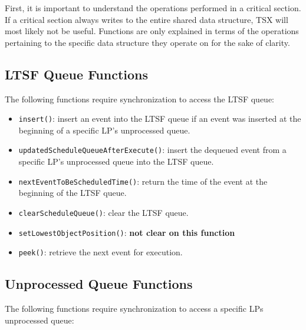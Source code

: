 \documentclass[11pt]{book}
\begin{document}
First, it is important to understand the operations performed in a critical section.  If a
critical section always writes to the entire shared data structure, TSX will most likely
not be useful.  Functions are only explained in terms of the operations pertaining to the
specific data structure they operate on for the sake of clarity.

\subsection{LTSF Queue Functions}

The following functions require synchronization to access the LTSF queue:

\vspace*{-\bigskipamount}
\begin{singlespace}
\begin{itemize}
  \item\texttt{insert()}: insert an event into the LTSF queue if an event was inserted at
    the beginning of a specific LP's unprocessed queue.
  \item\texttt{updatedScheduleQueueAfterExecute()}: insert the dequeued event from a
    specific LP's unprocessed queue into the LTSF queue.
  \item\texttt{nextEventToBeScheduledTime()}: return the time of the event at the
    beginning of the LTSF queue.
  \item\texttt{clearScheduleQueue()}: clear the LTSF queue.
  \item\texttt{setLowestObjectPosition()}: \textbf{not clear on this function}
  \item\texttt{peek()}: retrieve the next event for execution.
\end{itemize}
\end{singlespace}

\subsection{Unprocessed Queue Functions}

The following functions require synchronization to access a specific LPs unprocessed
queue:
\end{document}
